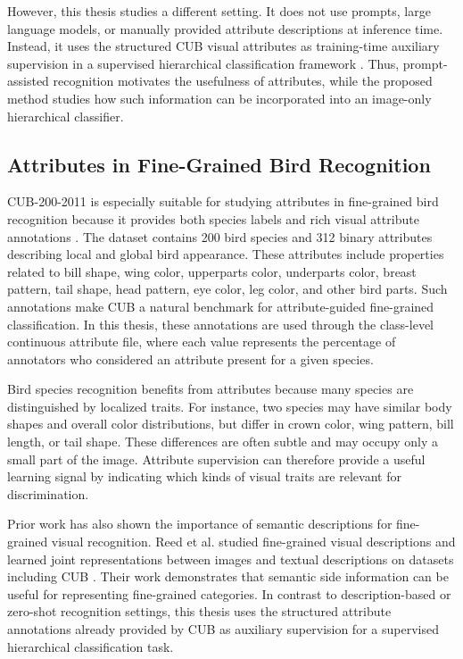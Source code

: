 However, this thesis studies a different setting. It does not use prompts, large language models, or manually provided attribute descriptions at inference time. Instead, it uses the structured CUB visual attributes as training-time auxiliary supervision in a supervised hierarchical classification framework \cite{wah2011cub}. Thus, prompt-assisted recognition motivates the usefulness of attributes, while the proposed method studies how such information can be incorporated into an image-only hierarchical classifier.



\subsection{Attributes in Fine-Grained Bird Recognition}

CUB-200-2011 is especially suitable for studying attributes in fine-grained bird recognition because it provides both species labels and rich visual attribute annotations \cite{wah2011cub}. The dataset contains 200 bird species and 312 binary attributes describing local and global bird appearance. These attributes include properties related to bill shape, wing color, upperparts color, underparts color, breast pattern, tail shape, head pattern, eye color, leg color, and other bird parts. Such annotations make CUB a natural benchmark for attribute-guided fine-grained classification. In this thesis, these annotations are used through the class-level continuous attribute file, where each value represents the percentage of annotators who considered an attribute present for a given species.

Bird species recognition benefits from attributes because many species are distinguished by localized traits. For instance, two species may have similar body shapes and overall color distributions, but differ in crown color, wing pattern, bill length, or tail shape. These differences are often subtle and may occupy only a small part of the image. Attribute supervision can therefore provide a useful learning signal by indicating which kinds of visual traits are relevant for discrimination.

Prior work has also shown the importance of semantic descriptions for fine-grained visual recognition. Reed et al. studied fine-grained visual descriptions and learned joint representations between images and textual descriptions on datasets including CUB \cite{reed2016learning}. Their work demonstrates that semantic side information can be useful for representing fine-grained categories. In contrast to description-based or zero-shot recognition settings, this thesis uses the structured attribute annotations already provided by CUB as auxiliary supervision for a supervised hierarchical classification task.

